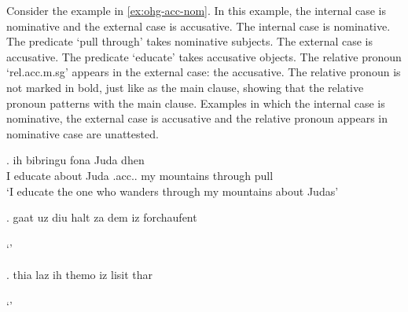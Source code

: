 Consider the example in \ref{ex:ohg-acc-nom}. In this example, the internal case is nominative and the external case is accusative.
The internal case is nominative. The predicate  `pull through' takes nominative subjects.
The external case is accusative. The predicate  `educate' takes accusative objects.
The relative pronoun  `\ac{rel}.\ac{acc}.\ac{m}.\ac{sg}' appears in the external case: the accusative. The relative pronoun is not marked in bold, just like as the main clause, showing that the relative pronoun patterns with the main clause.
Examples in which the internal case is nominative, the external case is accusative and the relative pronoun appears in nominative case are unattested.

\exg. ih bibringu fona Juda dhen   \\
 I educate\scsub{[acc]} about Juda .\ac{acc}.. my mountains {through pull}\scsub{[nom]}\\
 `I educate the one who wanders through my mountains about Judas' \label{ex:ohg-acc-nom}

  \exg. gaat uz diu halt za dem iz forchaufent\\
   \\
   `' 


  \exg. thia laz ih themo iz lisit thar\\
   \\
   `' 





